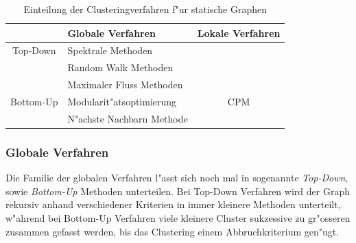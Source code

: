 \documentclass[journal]{vgtc}
\begin{document}
  
    \begin{table}[h]
    \caption{\label{tab:static_methods} Einteilung der Clusteringverfahren f"ur statische Graphen}
    \scriptsize
    \begin{center}
      \begin{tabular}{c|l|c}
	& Globale Verfahren & Lokale Verfahren\\
	\hline
	Top-Down  & Spektrale Methoden       & \\
	          & Random Walk Methoden     & \\
	          & Maximaler Fluss Methoden & \\
	\hline
	Bottom-Up & Modularit"atsoptimierung & CPM \\
	          & N"achste Nachbarn Methode & 
      \end{tabular}
    \end{center}
  \end{table}
  
  \subsubsection*{Globale Verfahren}
  Die Familie der globalen Verfahren l"asst sich noch mal in sogenannte \emph{Top-Down}, sowie
  \emph{Bottom-Up} Methoden \cite{Schaeffer} unterteilen. Bei Top-Down Verfahren wird der Graph rekursiv anhand
  verschiedener Kriterien in immer kleinere Methoden unterteilt, w"ahrend bei Bottom-Up Verfahren
  viele kleinere Cluster sukzessive zu gr"osseren zusammen gefasst werden, bis das Clustering einem
  Abbruchkriterium gen"ugt.
  
\end{document}
